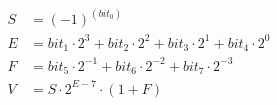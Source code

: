 \begin{equation*}
\begin{aligned}
    S &= (-1)^{(bit_0)} \\
    E &= bit_1 \cdot 2^3 + bit_2 \cdot 2^2 + bit_3 \cdot 2^1 + bit_4 \cdot 2^0 \\
    F &= bit_5 \cdot 2^{-1} + bit_6 \cdot 2^{-2} + bit_7 \cdot 2^{-3} \\
    V &= S \cdot 2^{E - 7} \cdot (1 + F)
\end{aligned}
\end{equation*}
